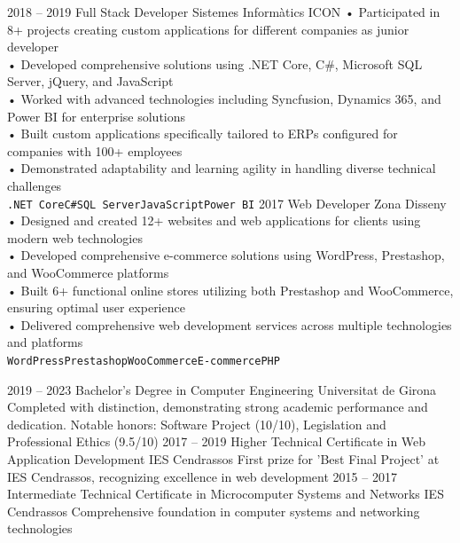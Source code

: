 \documentclass[9pt]{developercv} %
\begin{document}
\begin{entrylist}
	\entry
		{2018 -- 2019}
		{Full Stack Developer}
		{Sistemes Informàtics ICON}
		{• Participated in 8+ projects creating custom applications for different companies as junior developer\\
		• Developed comprehensive solutions using .NET Core, C\#, Microsoft SQL Server, jQuery, and JavaScript\\
		• Worked with advanced technologies including Syncfusion, Dynamics 365, and Power BI for enterprise solutions\\
		• Built custom applications specifically tailored to ERPs configured for companies with 100+ employees\\
		• Demonstrated adaptability and learning agility in handling diverse technical challenges\\ \texttt{.NET Core}\slashsep\texttt{C\#}\slashsep\texttt{SQL Server}\slashsep\texttt{JavaScript}\slashsep\texttt{Power BI}}
	\entry
		{2017}
		{Web Developer}
		{Zona Disseny}
		{• Designed and created 12+ websites and web applications for clients using modern web technologies\\
		• Developed comprehensive e-commerce solutions using WordPress, Prestashop, and WooCommerce platforms\\
		• Built 6+ functional online stores utilizing both Prestashop and WooCommerce, ensuring optimal user experience\\
		• Delivered comprehensive web development services across multiple technologies and platforms\\ \texttt{WordPress}\slashsep\texttt{Prestashop}\slashsep\texttt{WooCommerce}\slashsep\texttt{E-commerce}\slashsep\texttt{PHP}}
\end{entrylist}



\begin{entrylist}
	\entry
		{2019 -- 2023}
		{Bachelor's Degree in Computer Engineering}
		{Universitat de Girona}
		{Completed with distinction, demonstrating strong academic performance and dedication. Notable honors: Software Project (10/10), Legislation and Professional Ethics (9.5/10)}
	\entry
		{2017 -- 2019}
		{Higher Technical Certificate in Web Application Development}
		{IES Cendrassos}
		{First prize for 'Best Final Project' at IES Cendrassos, recognizing excellence in web development}
	\entry
		{2015 -- 2017}
		{Intermediate Technical Certificate in Microcomputer Systems and Networks}
		{IES Cendrassos}
		{Comprehensive foundation in computer systems and networking technologies}
\end{entrylist}
\end{document}
